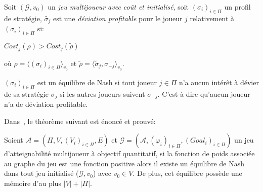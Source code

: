 
\begin{defi}
	
	Soit $(\mathcal{G}, v_{0})$ un \textit{jeu multijoueur avec coût et initialisé}, soit $(\sigma _{i})_{i \in \Pi}$ un profil de stratégie, $\tilde{\sigma _{j}}$ est une \textit{déviation profitable} pour le joueur $j$ relativement à $(\sigma _{i})_{i \in \Pi}$ si:
	\begin{center} $ Cost_{j}(\rho) > Cost_{j}(\tilde{\rho})$ \end{center}
	où $\rho = \langle (\sigma _{i})_{i \in \Pi} \rangle_{v_0}$ et $\tilde{\rho} = \langle \tilde{\sigma} _{j} ,\sigma _{-j} \rangle_{v_0}$. 
\end{defi}

\begin{rem}
	$(\sigma _{i})_{i\in \Pi}$ est un équilibre de Nash si tout joueur $j \in \Pi$ n'a aucun intérêt à dévier de sa stratégie $\sigma _{j}$ si les autres joueurs suivent $\sigma _{-j}$. C'est-à-dire qu'aucun joueur n'a de déviation profitable. 
\end{rem}





 Dans~\cite{DBLP:conf/lfcs/BrihayePS13}, le théorème suivant est énoncé et prouvé:

\begin{thm}
	Soient $\mathcal{A} = (\Pi, V, (V_{i})_{i \in \Pi}, E)$ et $\mathcal{G} = (\mathcal{A},(\varphi _{i})_{i \in \Pi}, (Goal_{i})_{i \in \Pi})$ un jeu d'atteignabilité multijoueur à objectif quantitatif, si la fonction de poids associée au graphe du jeu est une fonction positive alors il existe un équilibre de Nash dans tout jeu initialisé ($\mathcal{G},v_{0}$) avec $v_{0}\in V$. De plus, cet équilibre possède une mémoire d'au plus $|V| + |\Pi|$.
\end{thm}

